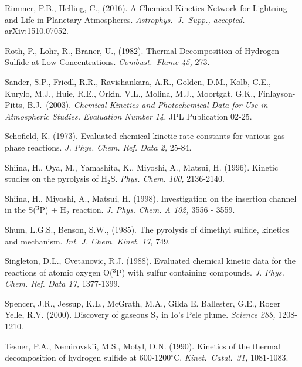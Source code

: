\documentclass[preprint]{aastex}
\newcounter{reaction}
\begin{document}
\begin{thebibliography}{00}
 Rimmer, P.B., Helling, C., (2016).
 A Chemical Kinetics Network for Lightning and Life in Planetary Atmospheres.
 {\em Astrophys.\ J.\ Supp.,} {\it accepted.} arXiv:1510.07052.


Roth, P., Lohr, R., Braner, U., (1982).
Thermal Decomposition of Hydrogen Sulfide at Low Concentrations.
{\em Combust.\ Flame 45,} 273.

Sander, S.P., Friedl, R.R.,  Ravishankara, A.R., Golden, D.M., Kolb, C.E., Kurylo, M.J., Huie, R.E., Orkin, V.L., Molina, M.J., Moortgat, G.K., Finlayson-Pitts, B.J.\ (2003).
{\em Chemical Kinetics and Photochemical Data for Use in Atmospheric Studies. Evaluation Number 14.} JPL Publication 02-25.

Schofield, K.  (1973).  Evaluated chemical kinetic rate constants for various gas phase reactions.  {\em J. Phys. Chem. Ref. Data 2,} 25-84.

Shiina, H., Oya, M., Yamashita, K., Miyoshi, A., Matsui, H. (1996). Kinetic studies on the pyrolysis of H$_2$S. {\em  Phys. Chem. 100,} 2136-2140.

Shiina, H., Miyoshi, A., Matsui, H. (1998). Investigation on the insertion channel in the S($^3$P) + H$_2$ reaction. 
{\em J. Phys. Chem. A 102,} 3556 - 3559.

Shum, L.G.S., Benson, S.W., (1985). 
The pyrolysis of dimethyl sulfide, kinetics and mechanism.
{\em Int. J. Chem. Kinet. 17,} 749.

Singleton, D.L., Cvetanovic, R.J.  (1988). Evaluated chemical kinetic data for the reactions of atomic oxygen O($^3$P) with sulfur containing compounds.  {\em J. Phys. Chem. Ref. Data 17,} 1377-1399.

Spencer, J.R., Jessup, K.L., McGrath, M.A., Gilda E. Ballester, G.E., Roger Yelle, R.V. (2000).
Discovery of gaseous S$_2$ in Io's Pele plume.
{\em Science 288,} 1208-1210.

Tesner, P.A., Nemirovskii, M.S., Motyl, D.N. (1990).
Kinetics of the thermal decomposition of hydrogen sulfide at 600-1200$^{\circ}$C.
{\em Kinet.\ Catal.\ 31,} 1081-1083.



\end{thebibliography}
\end{document}
